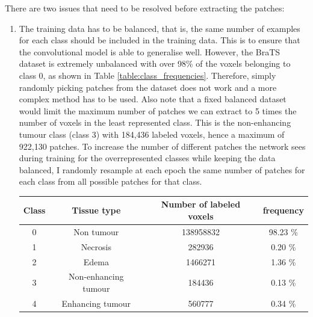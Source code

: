 \documentclass[12pt,a4paper,twoside,openright]{report}
\begin{document}
There are two issues that need to be resolved before extracting the patches:
\begin{enumerate}
	\item The training data has to be balanced, that is, the same number of examples for each class should be included in the training data. This is to ensure that the convolutional model is able to generalise well. However, the BraTS dataset is extremely unbalanced with over 98\% of the voxels belonging to class 0, as shown in Table \ref{table:class_frequencies}. Therefore, simply randomly picking patches from the dataset does not work and a more complex method has to be used. Also note that a fixed balanced dataset would limit the maximum number of patches we can extract to 5 times the number of voxels in the least represented class. This is the non-enhancing tumour class (class 3) with 184,436 labeled voxels, hence a maximum of 922,130 patches. To increase the number of different patches the network sees during training for the overrepresented classes while keeping the data balanced, I randomly resample at each epoch the same number of patches for each class from all possible patches for that class.
		\begin{table}
			\centering	
			\begin{tabular}{c c S[table-format=9.0] S[table-format=2.2]}
			\textbf{Class} & \textbf{Tissue type} & \textbf{Number of labeled voxels} & \textbf{frequency}\\
			  & Non tumour 				& 138958832 	& 98.23 \% \\ 
			1 & Necrosis 				& 282936 	& 0.20 \% \\ 
			2 & Edema					& 1466271 	& 1.36 \% \\ 
			3 & Non-enhancing tumour 	& 184436 	& 0.13 \% \\ 
			4 & Enhancing tumour		& 560777 	& 0.34 \% \\
			

\end{tabular}
\end{table}
\end{enumerate}
\end{document}
